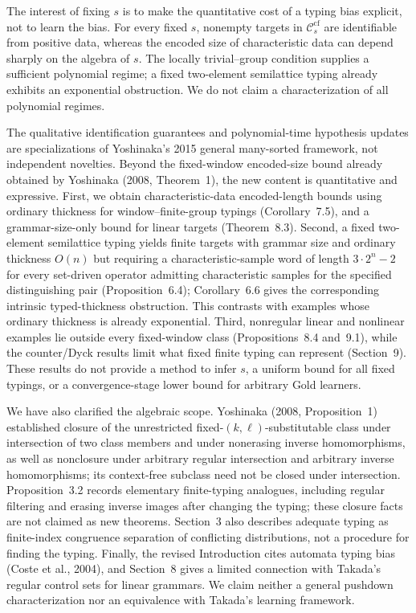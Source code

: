 \documentclass[
  10pt,
  a4paper,
]{article}
\begin{document}
The interest of fixing $s$ is to make the quantitative
cost of a typing bias explicit, not to learn the bias.
For every fixed $s$, nonempty targets in
$\mathcal C_s^{\mathrm{cf}}$ are identifiable from positive
data, whereas the encoded size of characteristic data
can depend sharply on the algebra of $s$.
The locally trivial--group condition supplies a sufficient
polynomial regime; a fixed two-element semilattice typing
already exhibits an exponential obstruction.
We do not claim a characterization of all polynomial regimes.

The qualitative identification guarantees and polynomial-time
hypothesis updates are specializations of Yoshinaka's 2015
general many-sorted framework, not independent novelties.
Beyond the fixed-window encoded-size bound already obtained by
Yoshinaka (2008, Theorem~1), the new content is quantitative and
expressive. First, we obtain characteristic-data encoded-length
bounds using ordinary thickness for window--finite-group
typings (Corollary~7.5), and a grammar-size-only bound for
linear targets (Theorem~8.3). Second, a fixed two-element
semilattice typing yields finite targets with grammar size and
ordinary thickness $O(n)$ but requiring a characteristic-sample
word of length $3\cdot2^n-2$ for every set-driven operator
admitting characteristic samples for the specified
distinguishing pair (Proposition~6.4); Corollary~6.6 gives
the corresponding intrinsic typed-thickness obstruction.
This contrasts with examples whose ordinary thickness is
already exponential. Third, nonregular linear and nonlinear
examples lie outside every fixed-window class
(Propositions~8.4 and~9.1), while the counter/Dyck results
limit what fixed finite typing can represent (Section~9).
These results do not provide a method to infer $s$, a uniform
bound for all fixed typings, or a convergence-stage lower
bound for arbitrary Gold learners.

We have also clarified the algebraic scope.
Yoshinaka (2008, Proposition~1) established closure of the
unrestricted fixed-$(k,\ell)$-substitutable class under
intersection of two class members and under nonerasing inverse
homomorphisms, as well as nonclosure under arbitrary regular
intersection and arbitrary inverse homomorphisms; its
context-free subclass need not be closed under intersection.
Proposition~3.2 records elementary finite-typing analogues,
including regular filtering and erasing inverse images after
changing the typing; these closure facts are not claimed as
new theorems. Section~3 also describes adequate typing as
finite-index congruence separation of conflicting distributions,
not a procedure for finding the typing. Finally, the revised
Introduction cites automata typing bias (Coste et al., 2004),
and Section~8 gives a limited connection with Takada's regular
control sets for linear grammars. We claim neither a general
pushdown characterization nor an equivalence with Takada's
learning framework.
\end{document}
